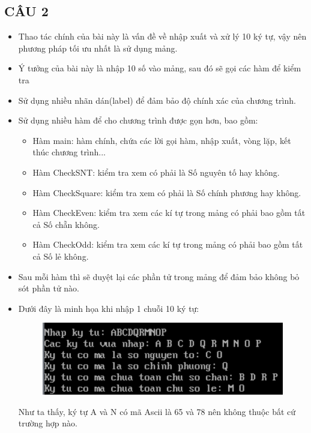 \documentclass[12pt, a4paper]{article}
\begin{document}
\subsection{CÂU 2}
\begin{itemize}
    \item Thao tác chính của bài này là vấn đề về nhập xuất và xử lý 10 ký tự, vậy nên phương pháp tối ưu nhất là sử dụng mảng.
    \item Ý tưởng của bài này là nhập 10 số vào mảng, sau đó sẽ gọi các hàm để kiểm tra
    \item Sử dụng nhiều nhãn dán(label) để đảm bảo độ chính xác của chương trình.
    \item Sử dụng nhiều hàm để cho chương trình được gọn hơn, bao gồm: 
    \begin{itemize}
        \item Hàm main: hàm chính, chứa các lời gọi hàm, nhập xuất, vòng lặp, kết thúc chương trình... 
        \item Hàm CheckSNT: kiểm tra xem có phải là Số nguyên tố hay không.
        \item Hàm CheckSquare: kiểm tra xem có phải là Số chính phương hay không. 
        \item Hàm CheckEven: kiểm tra xem các kí tự trong mảng có phải bao gồm tất cả Số chẵn không. 
        \item Hàm CheckOdd: kiểm tra xem các kí tự trong mảng có phải bao gồm tất cả Số lẻ không. 
    \end{itemize}
    \item Sau mỗi hàm thì sẽ duyệt lại các phần tử trong mảng để đảm bảo không bỏ sót phần tử nào.
    \item Dưới đây là minh họa khi nhập 1 chuỗi 10 ký tự:
    \begin{figure}[H]
        \begin{center}
            \includegraphics[scale = 1.5]{Kytu.png}
        \end{center}
    \end{figure}
    \normalsize{
    Như ta thấy, ký tự A và N có mã Ascii là 65 và 78 nên không thuộc bất cứ trường hợp nào.\\
}
\end{itemize}
\end{document}

